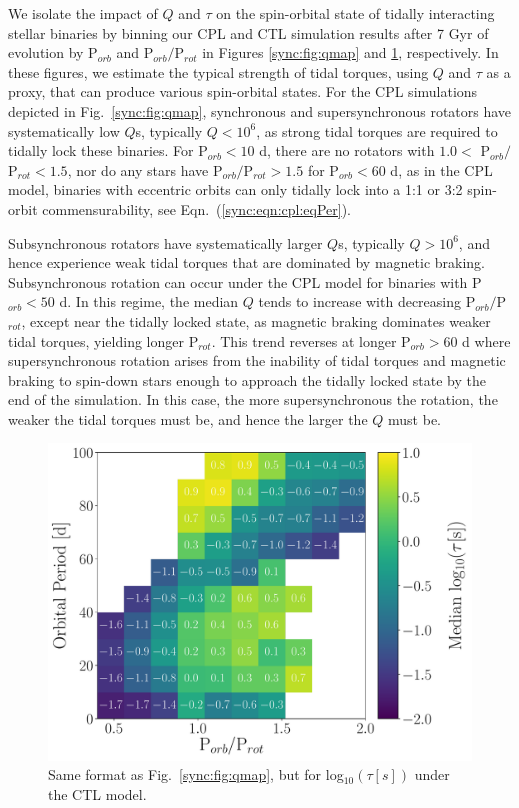 We isolate the impact of $Q$ and $\tau$ on the spin-orbital state of tidally interacting stellar binaries by binning our CPL and CTL simulation results after 7 Gyr of evolution by P$_{orb}$ and P$_{orb}/$P$_{rot}$ in Figures \ref{sync:fig:qmap} and \ref{sync:fig:taumap}, respectively. In these figures, we estimate the typical strength of tidal torques, using $Q$ and $\tau$ as a proxy, that can produce various spin-orbital states. For the CPL simulations depicted in Fig.~\ref{sync:fig:qmap}, synchronous and supersynchronous rotators have systematically low $Q$s, typically $Q < 10^6$, as strong tidal torques are required to tidally lock these binaries. For P$_{orb} < 10$ d, there are no rotators with $1.0 <$ P$_{orb}/$P$_{rot} < 1.5$, nor do any stars have P$_{orb}/$P$_{rot} > 1.5$ for P$_{orb} < 60$ d, as in the CPL model, binaries with eccentric orbits can only tidally lock into a 1:1 or 3:2 spin-orbit commensurability, see Eqn.~(\ref{sync:eqn:cpl:eqPer}).   

Subsynchronous rotators have systematically larger $Q$s, typically $Q > 10^6$, and hence experience weak tidal torques that are dominated by magnetic braking.  Subsynchronous rotation can occur under the CPL model for binaries with P$_{orb} < 50$ d. In this regime, the median $Q$ tends to increase with decreasing P$_{orb}/$P$_{rot}$, except near the tidally locked state, as magnetic braking dominates weaker tidal torques, yielding longer P$_{rot}$.  This trend reverses at longer P$_{orb} > 60$ d where supersynchronous rotation arises from the inability of tidal torques and magnetic braking to spin-down stars enough to approach the tidally locked state by the end of the simulation.  In this case, the more supersynchronous the rotation, the weaker the tidal torques must be, and hence the larger the $Q$ must be. 

\begin{figure}
	\includegraphics[width=\columnwidth]{porbProtPorbTauHist.pdf}
   \caption{Same format as Fig.~\ref{sync:fig:qmap}, but for log$_{10}(\tau [s])$ under the CTL model. }%
    \label{sync:fig:taumap}%
\end{figure}

